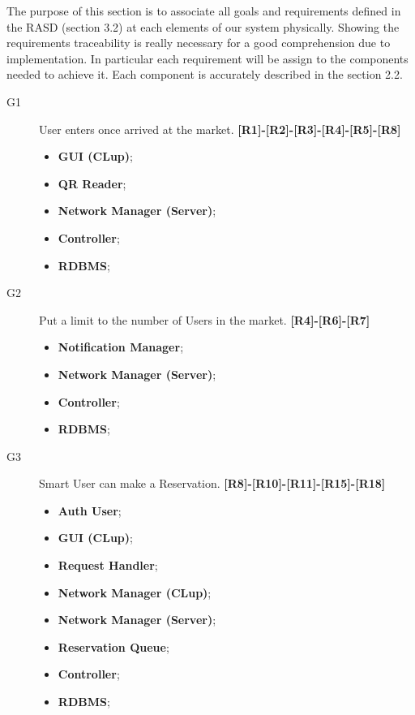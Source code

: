 The purpose of this section is to associate all goals and requirements defined in the RASD (section 3.2) at each elements of our system physically.
Showing the requirements traceability is really necessary for a good comprehension due to implementation.
In particular each requirement will be assign to the components needed to achieve it. 
Each component is accurately described in the section 2.2.


\begin{description}
    \item[G1]User enters once arrived at the market. \textbf{[R1]-[R2]-[R3]-[R4]-[R5]-[R8]}
    
    \begin{itemize}
        \item \textbf{GUI (CLup)}; 
        \item \textbf{QR Reader};  
        \item \textbf{Network Manager (Server)};  
        \item \textbf{Controller};
        \item \textbf{RDBMS};
    \end{itemize}
    
    \item[G2]Put a limit to the number of Users in the market. \textbf{[R4]-[R6]-[R7]}
    
    \begin{itemize}
        
        \item \textbf{Notification Manager};  
        \item \textbf{Network Manager (Server)};  
        \item \textbf{Controller};
        \item \textbf{RDBMS};
    \end{itemize}
    
    \item[G3]Smart User can make a Reservation. \textbf{[R8]-[R10]-[R11]-[R15]-[R18]}
    \begin{itemize}
        \item \textbf{Auth User};  
        \item \textbf{GUI (CLup)};  
        \item \textbf{Request Handler}; 
        \item \textbf{Network Manager (CLup)}; 
        \item \textbf{Network Manager (Server)};  
        \item \textbf{Reservation Queue};  
        \item \textbf{Controller};
        \item \textbf{RDBMS};
    \end{itemize}
        

\end{description}
